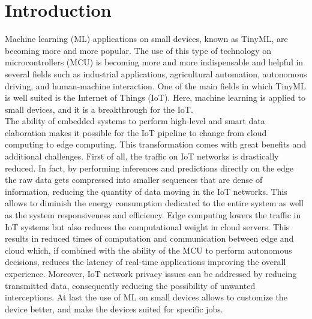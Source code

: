 \documentclass[12pt]{report}
\newcommand{\mychapter}[2]{
    \setcounter{chapter}{#1}
    \setcounter{section}{0}
    \chapter*{#2}
    \addcontentsline{toc}{chapter}{#2}
    }
\newcommand\blankpage{%
    \null
    \thispagestyle{empty}%
    \addtocounter{page}{0}%
    \newpage}
\begin{document}
\begin{figure}
 \centering 
 
\end{figure}

\afterpage{\blankpage}

\tableofcontents
\listoffigures
\listoftables
\afterpage{\blankpage}




\mychapter{0}{Introduction}

\label{intro}
Machine learning (ML) applications on small devices, known as TinyML, are becoming more and more popular. The use of this type of technology on microcontrollers (MCU) is becoming more and more indispensable and helpful in several fields such as industrial applications, agricultural automation, autonomous driving, and human-machine interaction. One of the main fields in which TinyML is well suited is the Internet of Things (IoT). Here, machine learning is applied to small devices, and it is a breakthrough for the IoT.\\
The ability of embedded systems to perform high-level and smart data elaboration makes it possible for the IoT pipeline to change from cloud computing to edge computing. This transformation comes with great benefits and additional challenges.
First of all, the traffic on IoT networks is drastically reduced. In fact, by performing inferences and predictions directly on the edge the raw data gets compressed into smaller sequences that are dense of information, reducing the quantity of data moving in the IoT networks. This allows to diminish the energy consumption dedicated to the entire system as well as the system responsiveness and efficiency.
Edge computing lowers the traffic in IoT systems but also reduces the computational weight in cloud servers. This results in reduced times of computation and communication between edge and cloud which, if combined with the ability of the MCU to perform autonomous decisions, reduces the latency of real-time applications improving the overall experience.
Moreover, IoT network privacy issues can be addressed by reducing transmitted data, consequently reducing the possibility of unwanted interceptions.
At last the use of ML on small devices allows to customize the device better, and make the devices suited for specific jobs. \\
\end{document}
